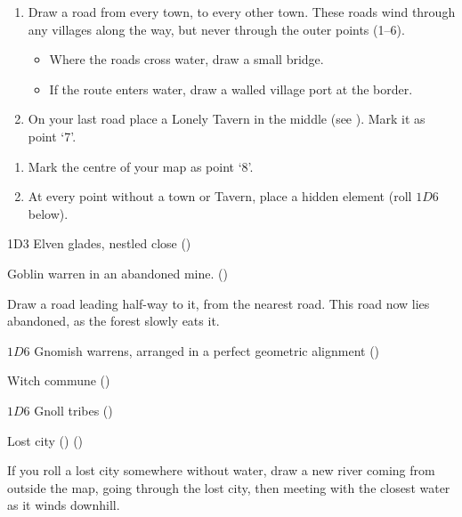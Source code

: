 \begin{multicols}{2}
\begin{dlist}
\end{dlist}


\begin{enumerate}
  \item
  Draw a road from every town, to every other town.
  These roads wind through any villages along the way, but never through the outer points (1--6).
  \begin{itemize}
    \item
    Where the roads cross water, draw a small bridge.
    \item
    If the route enters water, draw a walled village port at the border.
  \end{itemize}
  \item
  On your last road place a Lonely Tavern in the middle (see ).
  Mark it as point `7'.
\end{enumerate}

\label{mapOddities}

\begin{enumerate}
  \item
  Mark the centre of your map as point `8'.
  \item
  At every point without a town or Tavern, place a hidden element (roll $1D6$ below).
\end{enumerate}

\begin{multicols}{2}
\begin{dlist}\raggedright
\item
  1D3 Elven glades, nestled close (\El)
\item
  Goblin warren in an abandoned mine. (\N)

  Draw a road leading half-way to it, from the nearest road.
  This road now lies abandoned, as the forest slowly eats it.
\item
  $1D6$ Gnomish warrens, arranged in a perfect geometric alignment (\Gn)
  \columnbreak
\item
  Witch commune (\Hu)
\item
  $1D6$ Gnoll tribes (\Nl)
\item
  Lost city (\D) ()

  If you roll a lost city somewhere without water, draw a new river coming from outside the map, going through the lost city, then meeting with the closest water as it winds downhill.
\end{dlist}
\end{multicols}


\end{multicols}
